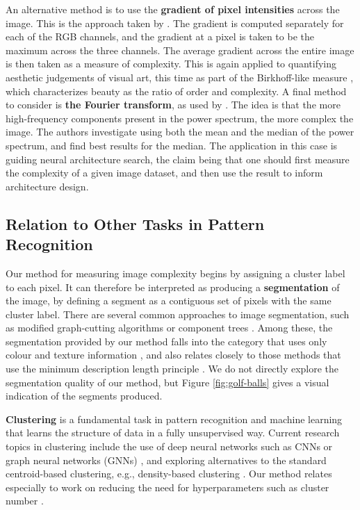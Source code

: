 \documentclass[a4paper,fleqn]{cas-sc}
\theoremstyle{remark}
\begin{document}
An alternative method is to use the \textbf{gradient of pixel intensities} across the image. This is the approach taken by \citet{redies2012phog}. The gradient is computed separately for each of the RGB channels, and the gradient at a pixel is taken to be the maximum across the three channels. The average gradient across the entire image is then taken as a measure of complexity. This is again applied to quantifying aesthetic judgements of visual art, this time as part of the Birkhoff-like measure \citep{birkhoff1933aesthetic}, which characterizes beauty as the ratio of order and complexity. 
A final method to consider is \textbf{the Fourier transform}, as used by \citet{khan2022leveraging}. The idea is that the more high-frequency components present in the power spectrum, the more complex the image. The authors investigate using both the mean and the median of the power spectrum, and find best results for the median.
The application in this case is guiding neural architecture search, the claim being that one should first measure the complexity of a given image dataset, and then use the result to inform architecture design.

\subsection{Relation to Other Tasks in Pattern Recognition}
Our method for measuring image complexity begins by assigning a cluster label to each pixel. It can therefore be interpreted as producing a \textbf{segmentation} of the image, by defining a segment as a contiguous set of pixels with the same cluster label. There are several common approaches to image segmentation, such as modified graph-cutting algorithms \citep{peng2011image} or component trees \citep{passat2011interactive}. Among these, the segmentation provided by our method falls into the category that uses only colour and texture information \citep{ilea2011image}, and also relates closely to those methods that use the minimum description length principle \citep{galland2005multi}. We do not directly explore the segmentation quality of our method, but Figure \ref{fig:golf-balls} gives a visual indication of the segments produced.

\textbf{Clustering} is a fundamental task in pattern recognition and machine learning that learns the structure of data in a fully unsupervised way. Current research topics in clustering include the use of deep neural networks such as CNNs \citep{caron2018deep,mahon2021selective} or graph neural networks (GNNs) \citep{fang2023robust}, and exploring alternatives to the standard centroid-based clustering, e.g., density-based clustering \citep{mcinnes2017hdbscan,kumar2016fast}. Our method relates especially to work on reducing the need for hyperparameters such as cluster number \citep{sinaga2020unsupervised,hou2023towards}.%
\end{document}
